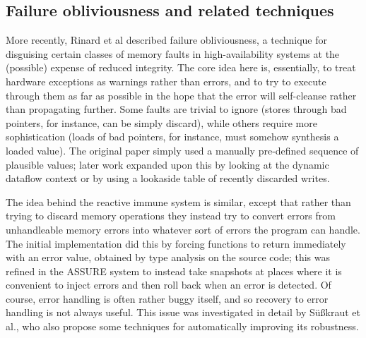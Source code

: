 \subsection{Failure obliviousness and related techniques}
More recently, Rinard et al\cite{Rinard2004} described failure
obliviousness, a technique for disguising certain classes of memory
faults in high-availability systems at the (possible) expense of
reduced integrity.  The core idea here is, essentially, to treat
hardware exceptions as warnings rather than errors, and to try to
execute through them as far as possible in the hope that the error
will self-cleanse rather than propagating further.  Some faults are
trivial to ignore (stores through bad pointers, for instance, can be
simply discard), while others require more sophistication (loads of
bad pointers, for instance, must somehow synthesis a loaded value).
The original paper simply used a manually pre-defined sequence of
plausible values; later work expanded upon this by looking at the
dynamic dataflow context\cite{Nagarajan2009} or by using a lookaside
table of recently discarded writes\cite{Rinard2005a}.  

The idea behind the reactive immune system\cite{Sidiroglou2005} is
similar, except that rather than trying to discard memory operations
they instead try to convert errors from unhandleable memory errors
into whatever sort of errors the program can handle.  The initial
implementation did this by forcing functions to return immediately
with an error value, obtained by type analysis on the source code;
this was refined in the ASSURE system\cite{Sidiroglou2005} to instead
take snapshots at places where it is convenient to inject errors and
then roll back when an error is detected.  Of course, error handling
is often rather buggy itself, and so recovery to error handling is not
always useful.  This issue was investigated in detail by
S\"{u}\ss{}kraut et al.\cite{Susskraut2006}, who also propose some
techniques for automatically improving its robustness.  

